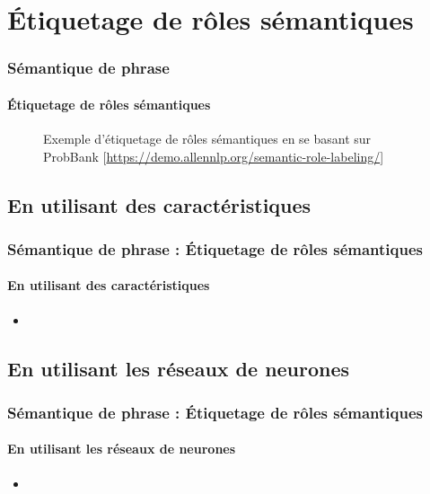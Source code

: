 \documentclass[xcolor=table]{beamer}
\begin{document}
\section{Étiquetage de rôles sémantiques}

\begin{frame}
\frametitle{Sémantique de phrase}
\framesubtitle{Étiquetage de rôles sémantiques}

\begin{figure}
	\caption{Exemple d'étiquetage de rôles sémantiques en se basant sur ProbBank [\url{https://demo.allennlp.org/semantic-role-labeling/}]}
\end{figure}
	
\end{frame}

\subsection{En utilisant des caractéristiques}

\begin{frame}
	\frametitle{Sémantique de phrase : Étiquetage de rôles sémantiques}
	\framesubtitle{En utilisant des caractéristiques}
	
	\begin{itemize}
		\item 
	\end{itemize}
	
\end{frame}

\subsection{En utilisant les réseaux de neurones}

\begin{frame}
	\frametitle{Sémantique de phrase : Étiquetage de rôles sémantiques}
	\framesubtitle{En utilisant les réseaux de neurones}
	
	\begin{itemize}
		\item 
	\end{itemize}
	
\end{frame}
\end{document}
